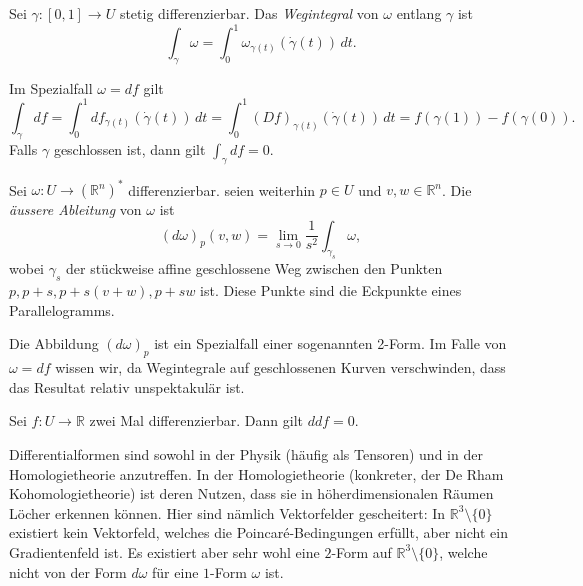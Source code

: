 \documentclass[../main.tex]{subfiles}
\begin{document}
\begin{definition}
  Sei $\gamma \colon [0, 1] \to U$ stetig differenzierbar.
  Das \emph{Wegintegral} von $\omega$ entlang $\gamma$ ist
  \[
    \int_\gamma \omega = \int_{0}^{1} \omega_{\gamma(t)}(\dot \gamma(t)) \, dt.
  \]
\end{definition}

\begin{remark}
  Im Spezialfall $\omega = df$ gilt
  \[
    \int_\gamma df = \int_{0}^{1} df_{\gamma(t)}(\dot \gamma(t)) \, dt
    = \int_{0}^{1} {(Df)}_{\gamma(t)}(\dot \gamma(t)) \, dt
    = f(\gamma(1)) - f(\gamma(0)).
  \]
  Falls $\gamma$ geschlossen ist, dann gilt
  $\int_\gamma df = 0$.
\end{remark}

\begin{definition}
  Sei $\omega \colon U \to {(\mathbb{R}^n)}^*$ differenzierbar.
  seien weiterhin $p \in U$ und $v, w \in \mathbb{R}^n$.
  Die \emph{äussere Ableitung} von $\omega$ ist
  \[
    {(d\omega)}_p(v, w)
    = \lim_{s \to 0} \frac{1}{s^2} \int_{\gamma_s} \omega,
  \]
  wobei $\gamma_s$ der stückweise affine 
  geschlossene Weg zwischen den
  Punkten $p, p+s, p+ s(v + w), p+sw$ ist.
  Diese Punkte sind die Eckpunkte eines Parallelogramms.
\end{definition}

Die Abbildung ${(d \omega)}_p$ ist ein Spezialfall einer sogenannten
2-Form. Im Falle von $\omega = df$ wissen wir,
da Wegintegrale auf geschlossenen Kurven verschwinden,
dass das Resultat relativ unspektakulär ist.

\begin{theorem*}
  Sei $f \colon U \to \mathbb{R}$ zwei Mal
  differenzierbar.
  Dann gilt $ddf = 0$.
\end{theorem*}

Differentialformen sind sowohl in der Physik (häufig als Tensoren)
und in der Homologietheorie anzutreffen.
In der Homologietheorie (konkreter, der De Rham Kohomologietheorie)
ist deren Nutzen, dass sie in höherdimensionalen Räumen
Löcher erkennen können. Hier sind nämlich Vektorfelder gescheitert:
In $\mathbb{R}^3 \setminus \{0\}$ existiert kein Vektorfeld,
welches die Poincaré-Bedingungen erfüllt, aber 
nicht ein Gradientenfeld ist.
Es existiert aber sehr wohl eine $2$-Form auf
$\mathbb{R}^3 \setminus \{0\}$, welche nicht von der Form
$d \omega$ für eine $1$-Form $\omega$ ist.
\end{document}

